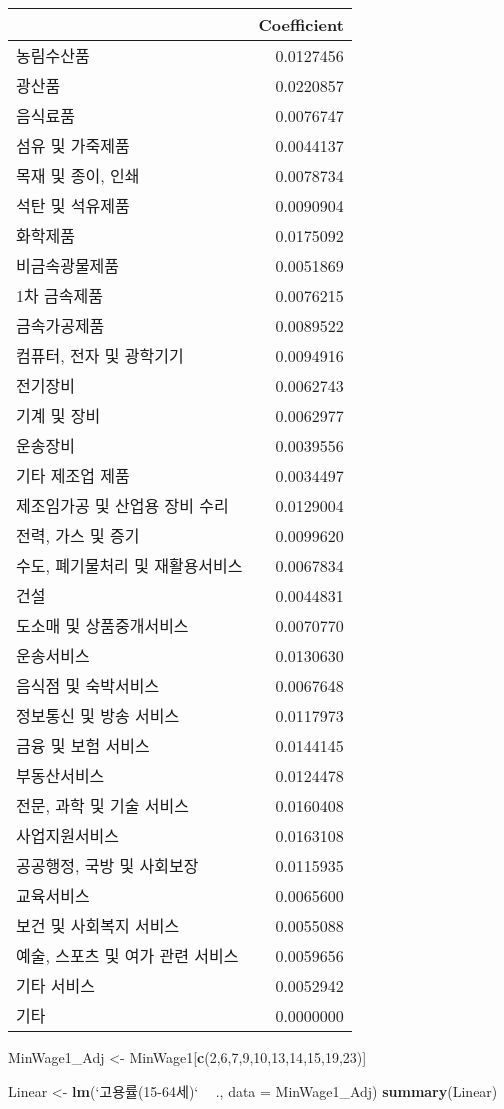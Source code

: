 \documentclass[]{article}
\newenvironment{Shaded}{\begin{snugshade}}{\end{snugshade}}
\newcommand{\DataTypeTok}[1]{\textcolor[rgb]{0.13,0.29,0.53}{#1}}
\newcommand{\DecValTok}[1]{\textcolor[rgb]{0.00,0.00,0.81}{#1}}
\newcommand{\KeywordTok}[1]{\textcolor[rgb]{0.13,0.29,0.53}{\textbf{#1}}}
\newcommand{\NormalTok}[1]{#1}
\newcommand{\OperatorTok}[1]{\textcolor[rgb]{0.81,0.36,0.00}{\textbf{#1}}}
\newcommand{\StringTok}[1]{\textcolor[rgb]{0.31,0.60,0.02}{#1}}
\begin{document}
\begin{longtable}[]{@{}lr@{}}
\toprule
& Coefficient\tabularnewline
\midrule
\endhead
농림수산품 & 0.0127456\tabularnewline
광산품 & 0.0220857\tabularnewline
음식료품 & 0.0076747\tabularnewline
섬유 및 가죽제품 & 0.0044137\tabularnewline
목재 및 종이, 인쇄 & 0.0078734\tabularnewline
석탄 및 석유제품 & 0.0090904\tabularnewline
화학제품 & 0.0175092\tabularnewline
비금속광물제품 & 0.0051869\tabularnewline
1차 금속제품 & 0.0076215\tabularnewline
금속가공제품 & 0.0089522\tabularnewline
컴퓨터, 전자 및 광학기기 & 0.0094916\tabularnewline
전기장비 & 0.0062743\tabularnewline
기계 및 장비 & 0.0062977\tabularnewline
운송장비 & 0.0039556\tabularnewline
기타 제조업 제품 & 0.0034497\tabularnewline
제조임가공 및 산업용 장비 수리 & 0.0129004\tabularnewline
전력, 가스 및 증기 & 0.0099620\tabularnewline
수도, 폐기물처리 및 재활용서비스 & 0.0067834\tabularnewline
건설 & 0.0044831\tabularnewline
도소매 및 상품중개서비스 & 0.0070770\tabularnewline
운송서비스 & 0.0130630\tabularnewline
음식점 및 숙박서비스 & 0.0067648\tabularnewline
정보통신 및 방송 서비스 & 0.0117973\tabularnewline
금융 및 보험 서비스 & 0.0144145\tabularnewline
부동산서비스 & 0.0124478\tabularnewline
전문, 과학 및 기술 서비스 & 0.0160408\tabularnewline
사업지원서비스 & 0.0163108\tabularnewline
공공행정, 국방 및 사회보장 & 0.0115935\tabularnewline
교육서비스 & 0.0065600\tabularnewline
보건 및 사회복지 서비스 & 0.0055088\tabularnewline
예술, 스포츠 및 여가 관련 서비스 & 0.0059656\tabularnewline
기타 서비스 & 0.0052942\tabularnewline
기타 & 0.0000000\tabularnewline
\bottomrule
\end{longtable}

\begin{Shaded}
\begin{Highlighting}[]
\NormalTok{MinWage1_Adj <-}\StringTok{ }\NormalTok{MinWage1[}\KeywordTok{c}\NormalTok{(}\DecValTok{2}\NormalTok{,}\DecValTok{6}\NormalTok{,}\DecValTok{7}\NormalTok{,}\DecValTok{9}\NormalTok{,}\DecValTok{10}\NormalTok{,}\DecValTok{13}\NormalTok{,}\DecValTok{14}\NormalTok{,}\DecValTok{15}\NormalTok{,}\DecValTok{19}\NormalTok{,}\DecValTok{23}\NormalTok{)]}

\NormalTok{Linear <-}\StringTok{ }\KeywordTok{lm}\NormalTok{(}\StringTok{`}\DataTypeTok{고용률(15-64세)}\StringTok{`} \OperatorTok{~}\StringTok{ }\NormalTok{., }\DataTypeTok{data =}\NormalTok{ MinWage1_Adj)}
\KeywordTok{summary}\NormalTok{(Linear)}
\end{Highlighting}
\end{Shaded}
\end{document}
